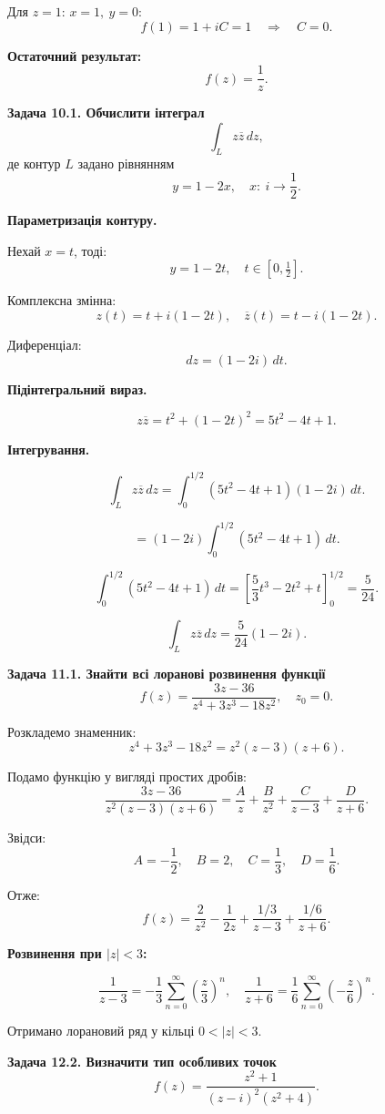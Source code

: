 \documentclass[12pt,a4paper]{article}
\begin{document}
Для \(z=1\): \(x=1,\ y=0\):
\[
f(1)=1+iC=1 \quad \Rightarrow \quad C=0.
\]

\textbf{Остаточний результат:}
\[
\boxed{f(z)=\frac{1}{z}}.
\]

\textbf{Задача 10.1. Обчислити інтеграл}
\[
\int_L z\overline{z}\,dz,
\]
де контур \(L\) задано рівнянням
\[
y=1-2x,\quad x:\ i\to \frac12.
\]

\textbf{Параметризація контуру.}

Нехай \(x=t\), тоді:
\[
y=1-2t,\quad t\in[0,\tfrac12].
\]

Комплексна змінна:
\[
z(t)=t+i(1-2t),
\quad
\overline{z}(t)=t-i(1-2t).
\]

Диференціал:
\[
dz=(1-2i)\,dt.
\]

\textbf{Підінтегральний вираз.}

\[
z\overline{z}
=
t^2+(1-2t)^2
=
5t^2-4t+1.
\]

\textbf{Інтегрування.}

\[
\int_L z\overline{z}\,dz
=
\int_0^{1/2}(5t^2-4t+1)(1-2i)\,dt.
\]

\[
=(1-2i)\int_0^{1/2}(5t^2-4t+1)\,dt.
\]

\[
\int_0^{1/2}(5t^2-4t+1)\,dt
=
\left[\frac{5}{3}t^3-2t^2+t\right]_0^{1/2}
=
\frac{5}{24}.
\]

\[
\boxed{\int_L z\overline{z}\,dz=\frac{5}{24}(1-2i)}.
\]

\textbf{Задача 11.1. Знайти всі лоранові розвинення функції}
\[
f(z)=\frac{3z-36}{z^4+3z^3-18z^2},
\quad z_0=0.
\]

Розкладемо знаменник:
\[
z^4+3z^3-18z^2=z^2(z-3)(z+6).
\]

Подамо функцію у вигляді простих дробів:
\[
\frac{3z-36}{z^2(z-3)(z+6)}
=
\frac{A}{z}+\frac{B}{z^2}+\frac{C}{z-3}+\frac{D}{z+6}.
\]

Звідси:
\[
A=-\frac12,\quad B=2,\quad C=\frac13,\quad D=\frac16.
\]

Отже:
\[
f(z)=\frac{2}{z^2}-\frac{1}{2z}
+\frac{1/3}{z-3}+\frac{1/6}{z+6}.
\]

\textbf{Розвинення при \(|z|<3\):}

\[
\frac{1}{z-3}
=-\frac13\sum_{n=0}^\infty\left(\frac{z}{3}\right)^n,
\quad
\frac{1}{z+6}
=\frac16\sum_{n=0}^\infty\left(-\frac{z}{6}\right)^n.
\]

Отримано лорановий ряд у кільці \(0<|z|<3\).

\textbf{Задача 12.2. Визначити тип особливих точок}
\[
f(z)=\frac{z^2+1}{(z-i)^2(z^2+4)}.
\]
\end{document}
